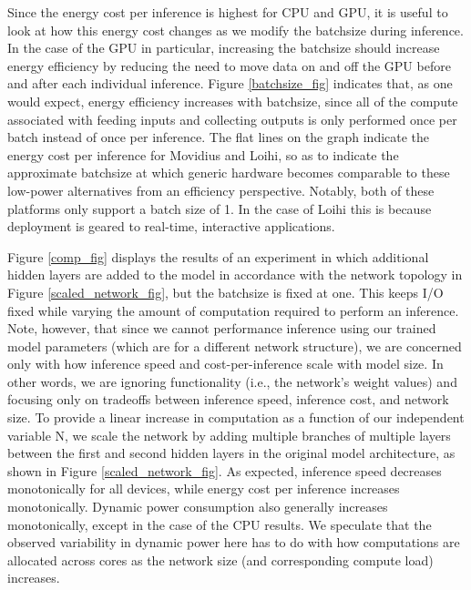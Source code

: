 \documentclass[sigconf, screen]{acmart}
\begin{document}
Since the energy cost per inference is highest for CPU and GPU, it is useful to look at how this energy cost changes as we modify the batchsize during inference. In the case of the GPU in particular, increasing the batchsize should increase energy efficiency by reducing the need to move data on and off the GPU before and after each individual inference. Figure \ref{batchsize_fig} indicates that, as one would expect, energy efficiency increases with batchsize, since all of the compute associated with feeding inputs and collecting outputs is only performed once per batch instead of once per inference. The flat lines on the graph indicate the energy cost per inference for Movidius and Loihi, so as to indicate the approximate batchsize at which generic hardware becomes comparable to these low-power alternatives from an efficiency perspective. Notably, both of these platforms only support a batch size of 1. In the case of Loihi this is because deployment is geared to real-time, interactive applications.

Figure \ref{comp_fig} displays the results of an experiment in which additional hidden layers are added to the model in accordance with the network topology in Figure \ref{scaled_network_fig}, but the batchsize is fixed at one. This keeps I/O fixed while varying the amount of computation required to perform an inference. Note, however, that since we cannot performance inference using our trained model parameters (which are for a different network structure), we are concerned only with how inference speed and cost-per-inference scale with model size. In other words, we are ignoring functionality (i.e., the network's weight values) and focusing only on tradeoffs between inference speed, inference cost, and network size. To provide a linear increase in computation as a function of our independent variable N, we scale the network by adding multiple branches of multiple layers between the first and second hidden layers in the original model architecture, as shown in Figure \ref{scaled_network_fig}. As expected, inference speed decreases monotonically for all devices, while energy cost per inference increases monotonically. Dynamic power consumption also generally increases monotonically, except in the case of the CPU results. We speculate that the observed variability in dynamic power here has to do with how computations are allocated across cores as the network size (and corresponding compute load) increases.
\end{document}
